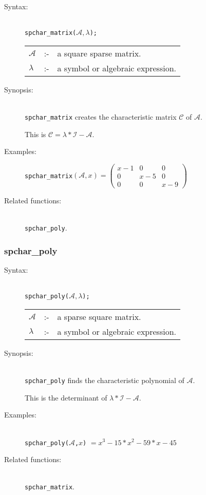 \begin{description}
\item[Syntax:]\mbox{}\\
\texttt{spchar\_matrix($\mathcal{A},\lambda$);}\\[2mm]
\begin{tabular}{l l l}
$\mathcal{A}$ &:-& a square sparse matrix. \\
$\lambda$  &:-& a symbol or algebraic expression.
\end{tabular}

\item[Synopsis:]\mbox{}\\
\texttt{spchar\_matrix} creates the characteristic matrix $\mathcal{C}$ of
$\mathcal{A}$.

This is $\mathcal{C} = \lambda * \mathcal{I} - \mathcal{A}$.

\item[Examples:]
\texttt{spchar\_matrix}\((\mathcal{A},x) =
\begin{pmatrix} x-1 & 0 & 0 \\ 0 & x-5 & 0 \\ 0 & 0 & x-9 \end{pmatrix}\)

\item[Related functions:]\mbox{}\\
\texttt{spchar\_poly}.
\end{description}

\subsubsection{spchar\_poly}
\label{sparse:spchar_poly}
\hypertarget{operator:SPCHAR_POLY}{}

\begin{description}
\item[Syntax:]\mbox{}\\
\texttt{spchar\_poly($\mathcal{A},\lambda$);}\\[2mm]
\begin{tabular}{l l l}
$\mathcal{A}$ &:-& a sparse square matrix. \\
$\lambda$ &:-& a symbol or algebraic expression.
\end{tabular}

\item[Synopsis:]\mbox{}\\
\texttt{spchar\_poly} finds the characteristic polynomial of
                $\mathcal{A}$.

This is the determinant of $\lambda * \mathcal{I} - \mathcal{A}$.

\item[Examples:]\mbox{}\\
\texttt{spchar\_poly($\mathcal{A}$,$x$)} $= x^3-15*x^2-59*x-45$

\item[Related functions:]\mbox{}\\
\texttt{spchar\_matrix}.
\end{description}

